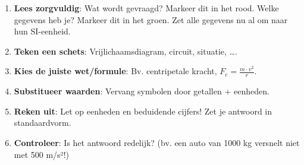\documentclass{ximera}
\begin{document}
\begin{example}
\begin{enumerate}
    \item \textbf{Lees zorgvuldig}: Wat wordt gevraagd? Markeer dit in het rood. Welke gegevens heb je? Markeer dit in het groen. Zet alle gegevens nu al om naar hun SI-eenheid.
    \item \textbf{Teken een schets}: Vrijlichaamsdiagram, circuit, situatie, \dots.
    \item \textbf{Kies de juiste wet/formule}: Bv. centripetale kracht, \(F_c = \frac{m\cdot v^2}{r}\).
    \item \textbf{Substitueer waarden}: Vervang symbolen door getallen + eenheden.
    \item \textbf{Reken uit}: Let op eenheden en beduidende cijfers! Zet je antwoord in standaardvorm.
    \item \textbf{Controleer}: Is het antwoord redelijk? (bv. een auto van 1000 kg versnelt niet met 500 m/s²!)
\end{enumerate}
\end{example}


\end{document}
